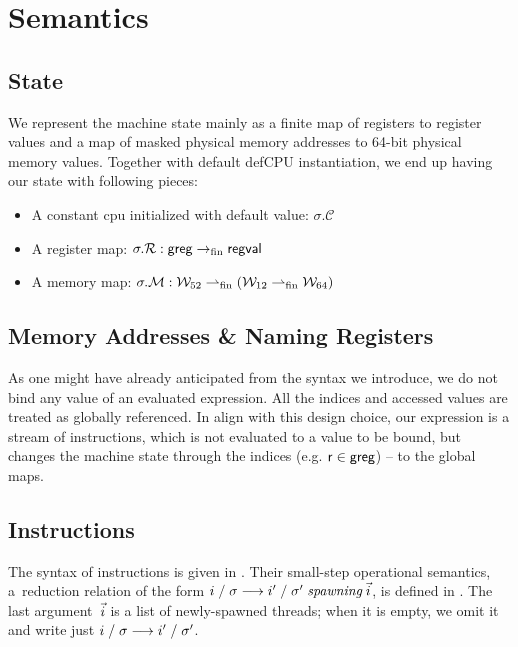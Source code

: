 \section{Semantics}
\label{sec:semantics}
\subsection{State}
\label{sec:state}
We represent the machine state mainly as a finite map of registers to register values and a map of masked physical memory addresses to 64-bit physical memory values. Together with default def\textsf{CPU} instantiation, we end up having our state with following pieces:
\begin{itemize}
\item A constant cpu initialized with default value: $\sigma.\mathcal{C}$
\item A register map: $\sigma.\mathcal{R}: \mathsf{greg} \rightarrow_{\textrm{fin}} \mathsf{regval} $
\item A memory map: $\sigma.\mathcal{M}: \mathcal{W}_{52} \rightharpoonup_{\textrm{fin}} (\mathcal{W}_{12} \rightharpoonup_{\textrm{fin}} \mathcal{W}_{64} )$
\end{itemize}
\subsection{Memory Addresses \& Naming Registers}
\label{sec:}
As one might have already anticipated from the syntax we introduce, we do not bind any value of an evaluated expression. All the indices and accessed values are treated as globally referenced. In align with this design choice, our expression is a stream of instructions, which is not evaluated to a value to be bound, but changes the machine state through the indices (e.g. $\mathsf{r}\in\mathsf{greg}$) -- to the global maps. 
\subsection{Instructions}
\label{sec:instrsemantics}
The syntax of instructions is given in . Their
small-step operational semantics, a~reduction relation of the form
$i\;/\;\sigma\longrightarrow i'\;/\;\sigma'\mathrel{\textit{spawning}}\vec{i}$,
is defined in .
%
The last argument~$\vec{i}$ is a list of newly-spawned threads;
when it is empty, we omit it
and write just $i\;/\;\sigma\longrightarrow i'\;/\;\sigma'$.
